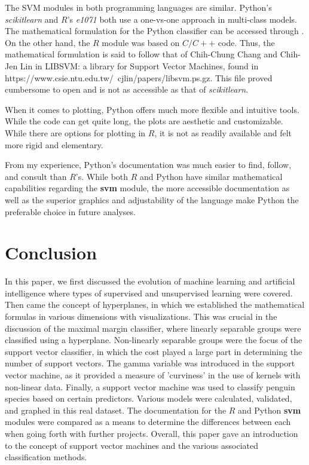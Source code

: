 \documentclass[12pt]{article}
\begin{document}
The SVM modules in both programming languages are similar. Python's \textit{scikitlearn} and $R$'s \textit{e1071} both use a one-vs-one approach in multi-class models. The mathematical formulation for the Python classifier can be accessed through \cite{scikit_svm}. On the other hand, the $R$ module was based on $C/C++$ code. Thus, the mathematical formulation is said to follow that of Chih-Chung Chang and Chih-Jen Lin in
LIBSVM: a library for Support Vector Machines, found in https://www.csie.ntu.edu.tw/~cjlin/papers/libsvm.ps.gz. This file proved cumbersome to open and is not as accessible as that of \textit{scikitlearn}.

When it comes to plotting, Python offers much more flexible and intuitive tools. While the code can get quite long, the plots are aesthetic and customizable. While there are options for plotting in $R$, it is not as readily available and felt more rigid and elementary.

From my experience, Python's documentation was much easier to find, follow, and consult than $R$'s. While both $R$ and Python have similar mathematical capabilities regarding the \textbf{svm} module, the more accessible documentation as well as the superior graphics and adjustability of the language make Python the preferable choice in future analyses.

\section{Conclusion}
In this paper, we first discussed the evolution of machine learning and artificial intelligence where types of supervised and unsupervised learning were covered. Then came the concept of hyperplanes, in which we established the mathematical formulas in various dimensions with visualizations. This was crucial in the discussion of the maximal margin classifier, where linearly separable groups were classified using a hyperplane. Non-linearly separable groups were the focus of the support vector classifier, in which the cost played a large part in determining the number of support vectors. The gamma variable was introduced in the support vector machine, as it provided a measure of 'curviness' in the use of kernels with non-linear data. Finally, a support vector machine was used to classify penguin species based on certain predictors. Various models were calculated, validated, and graphed in this real dataset. The documentation for the $R$ and Python \textbf{svm} modules were compared as a means to determine the differences between each when going forth with further projects. Overall, this paper gave an introduction to the concept of support vector machines and the various associated classification methods.

\newpage
\thispagestyle{empty}


\end{document}
